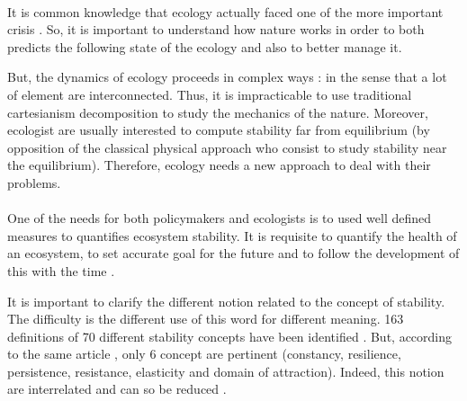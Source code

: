 \documentclass{article}
\begin{document}
\paragraph{} 

It is common knowledge that ecology actually faced one of the more important crisis \cite{oosthoek_humanity_2005}. So, it is important to understand how nature works in order to both predicts the following state of the ecology and also to better manage it.

But, the dynamics of ecology proceeds in complex ways : in the sense that a lot of element are interconnected. Thus, it is impracticable to use traditional cartesianism decomposition to study the mechanics of the nature. Moreover, ecologist are usually interested to compute stability far from equilibrium (by opposition of the classical physical approach who consist to study stability near the equilibrium). %
Therefore, ecology needs a new approach to deal with their problems. 




\paragraph{} %
One of the needs for both policymakers and ecologists is to used well defined measures to quantifies ecosystem stability. It is requisite to quantify the health of an ecosystem, to set accurate goal for the future and to follow the development of this with the time \cite{donohue_navigating_2016} \cite{mayer2008strengths}. 

It is important to clarify the different notion related to the concept of stability. The difficulty is the different use of this word for different meaning. 163 definitions of 70 different stability concepts have been identified \cite{grimm1997babel}. %
But, according to the same article \cite{grimm1997babel}, only 6 concept are pertinent (constancy, resilience, persistence, resistance, elasticity and domain of attraction). Indeed, this notion are interrelated and can so be reduced \cite{donohue2013dimensionality}.
\end{document}
